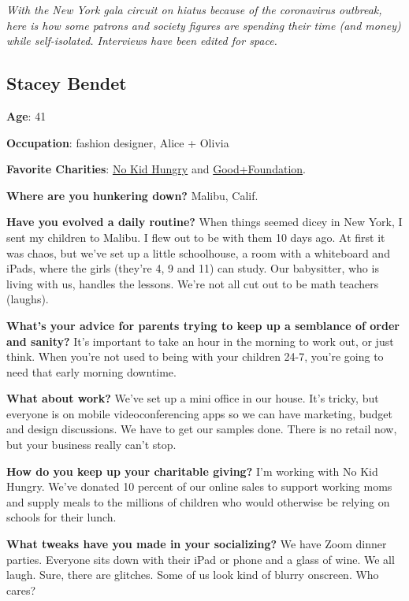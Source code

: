 \emph{With the New York gala circuit on hiatus because of the
coronavirus outbreak, here is how some patrons and society figures are
spending their time (and money) while self-isolated. Interviews have
been edited for space.}

\hypertarget{stacey-bendet}{%
\subsection{Stacey Bendet}\label{stacey-bendet}}

\textbf{Age}: 41

\textbf{Occupation}: fashion designer, Alice + Olivia

\textbf{Favorite Charities}: \href{https://www.nokidhungry.org/}{No Kid
Hungry} and \href{https://goodplusfoundation.org/}{Good+Foundation}.

\textbf{Where are you hunkering down?} Malibu, Calif.

\textbf{Have you evolved a daily routine?} When things seemed dicey in
New York, I sent my children to Malibu. I flew out to be with them 10
days ago. At first it was chaos, but we've set up a little schoolhouse,
a room with a whiteboard and iPads, where the girls (they're 4, 9 and
11) can study. Our babysitter, who is living with us, handles the
lessons. We're not all cut out to be math teachers (laughs).

\textbf{What's your advice for parents trying to keep up a semblance of
order and sanity?} It's important to take an hour in the morning to work
out, or just think. When you're not used to being with your children
24-7, you're going to need that early morning downtime.

\textbf{What about work?} We've set up a mini office in our house. It's
tricky, but everyone is on mobile videoconferencing apps so we can have
marketing, budget and design discussions. We have to get our samples
done. There is no retail now, but your business really can't stop.

\textbf{How do you keep up your charitable giving?} I'm working with No
Kid Hungry. We've donated 10 percent of our online sales to support
working moms and supply meals to the millions of children who would
otherwise be relying on schools for their lunch.

\textbf{What tweaks have you made in your socializing?} We have Zoom
dinner parties. Everyone sits down with their iPad or phone and a glass
of wine. We all laugh. Sure, there are glitches. Some of us look kind of
blurry onscreen. Who cares?

